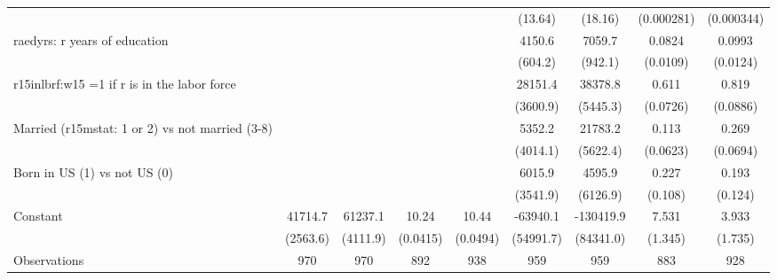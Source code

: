 \begin{table}[htbp]
\begin{tabular}{l*{8}{c}}
                &                  &                  &                  &                  &  (13.64)         &  (18.16)         &(0.000281)         &(0.000344)         \\
\addlinespace
raedyrs: r years of education&                  &                  &                  &                  &   4150.6\sym{***}&   7059.7\sym{***}&   0.0824\sym{***}&   0.0993\sym{***}\\
                &                  &                  &                  &                  &  (604.2)         &  (942.1)         & (0.0109)         & (0.0124)         \\
\addlinespace
r15inlbrf:w15 =1 if r is in the labor force&                  &                  &                  &                  &  28151.4\sym{***}&  38378.8\sym{***}&    0.611\sym{***}&    0.819\sym{***}\\
                &                  &                  &                  &                  & (3600.9)         & (5445.3)         & (0.0726)         & (0.0886)         \\
\addlinespace
Married (r15mstat: 1 or 2) vs not married (3-8)&                  &                  &                  &                  &   5352.2         &  21783.2\sym{***}&    0.113\sym{*}  &    0.269\sym{***}\\
                &                  &                  &                  &                  & (4014.1)         & (5622.4)         & (0.0623)         & (0.0694)         \\
\addlinespace
Born in US (1) vs not US (0)&                  &                  &                  &                  &   6015.9\sym{*}  &   4595.9         &    0.227\sym{**} &    0.193         \\
                &                  &                  &                  &                  & (3541.9)         & (6126.9)         &  (0.108)         &  (0.124)         \\
\addlinespace
Constant        &  41714.7\sym{***}&  61237.1\sym{***}&    10.24\sym{***}&    10.44\sym{***}& -63940.1         &-130419.9         &    7.531\sym{***}&    3.933\sym{**} \\
                & (2563.6)         & (4111.9)         & (0.0415)         & (0.0494)         &(54991.7)         &(84341.0)         &  (1.345)         &  (1.735)         \\
\midrule
Observations    &      970         &      970         &      892         &      938         &      959         &      959         &      883         &      928         \\

\end{tabular}
\end{table}
